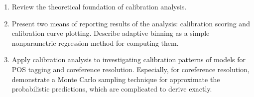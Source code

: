 \begin{enumerate}
  \item Review the theoretical foundation of calibration analysis.
  \item Present two means of reporting results of the analysis: calibration scoring and calibration curve plotting. Describe adaptive binning as a simple nonparametric regression method for computing them. 
  \item Apply calibration analysis to investigating calibration patterns of models for POS tagging and coreference resolution. Especially, for coreference resolution, demonstrate a Monte Carlo sampling technique for approximate the probabilistic predictions, which are complicated to derive exactly.   
\end{enumerate}

